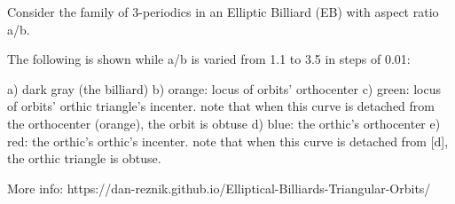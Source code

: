 Consider the family of 3-periodics in an Elliptic Billiard (EB) with  aspect ratio a/b. 

The following is shown while a/b is varied from 1.1 to 3.5 in steps of 0.01:

a) dark gray (the billiard)
b) orange: locus of orbits' orthocenter
c) green: locus of orbits' orthic triangle's incenter. note that when this curve is detached from the orthocenter (orange), the orbit is obtuse
d) blue: the orthic's orthocenter
e) red: the orthic's orthic's incenter. note that when this curve is detached from [d], the orthic triangle is obtuse.

More info: https://dan-reznik.github.io/Elliptical-Billiards-Triangular-Orbits/